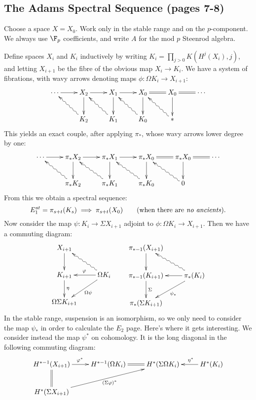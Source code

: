 \documentclass[11pt]{article}
\begin{document}
\begin{ASSp7-8}

\subsection*{The Adams Spectral Sequence (pages 7-8)}
Choose a space $X=X_0$. Work only in the stable range  and on the $p$-component. We always use $\F_p$ coefficients, and write $A$ for the mod $p$ Steenrod algebra.

Define spaces $X_i$ and $K_i$ inductively by writing $K_i=\prod_{j>0}K(H^j(X_i),j)$, and letting $X_{i+1}$ be the fibre of the obvious map $X_i\to K_i$. We have a system of fibrations, with wavy arrows denoting maps $\phi:\Omega K_i\to X_{i+1}$:
\[\xymatrix{
\cdots\ar[r]&
X_2\ar[r]\ar[d]&
X_1\ar[r]\ar[d]&
X_0\ar@{=}[r]\ar[d]&
X_0\ar@{=}[r]\ar[d]&
\cdots\\
&
K_2\ar@{~>}[ul]&
K_1\ar@{~>}[ul]&
K_0\ar@{~>}[ul]&
\ast\ar@{~>}[ul]&
}\]
This yields an exact couple, after applying $\pi_*$, whose wavy arrows lower degree by one:
\[\xymatrix{
\cdots\ar[r]&
\pi_*X_2\ar[r]\ar[d]&
\pi_*X_1\ar[r]\ar[d]&
\pi_*X_0\ar@{=}[r]\ar[d]&
\pi_*X_0\ar@{=}[r]\ar[d]&
\cdots\\
&
\pi_*K_2\ar@{~>}[ul]&
\pi_*K_1\ar@{~>}[ul]&
\pi_*K_0\ar@{~>}[ul]&
0\ar@{~>}[ul]&
}
\]
From this we obtain a spectral sequence:
\[E_1^{st}=\pi_{s+t}(K_s)\implies \pi_{s+t}(X_0)\textup{\qquad (when there are \textit{no ancients}).}\]
Now consider the map $\psi:K_i\to\Sigma X_{i+1}$ adjoint to $\phi:\Omega K_i\to X_{i+1}$. Then we have a commuting diagram:
\[\xymatrix{
X_{i+1}\ar[d]\\
K_{i+1}\ar[d]^\eta&\Omega K_i\ar[l]_\phi\ar[ld]^{\Omega\psi}\ar@{~>}[lu]\\
\Omega\Sigma K_{i+1}
}
\qquad 
\xymatrix{
\pi_{*-1}(X_{i+1})\ar[d]\\
\pi_{*-1}(K_{i+1})\ar[d]^\Sigma&\pi_{*} (K_i)\ar[l]\ar[ld]^{\psi_*}\ar@{~>}[lu]\\
\pi_{*}(\Sigma K_{i+1})
}
\]
In the stable range, suspension is an isomorphism, so we only need to consider the map $\psi_*$ in order to calculate the $E_2$ page. Here's where it gets interesting. We consider instead the map $\psi^*$ on cohomology. It is the long diagonal in the following commuting diagram:
\[\xymatrix{
H^{*-1}(X_{i+1})\ar@{=}[d]\ar[r]^{\phi^*}&H^{*-1}(\Omega K_i)\ar@{=}[r]&H^*(\Sigma\Omega K_i)& H^*(K_i)\ar[l]_{\quad  \eta^*}\\
H^{*}(\Sigma X_{i+1})\ar[rru]_{(\Sigma\phi)^*}&\\
}\]
\end{ASSp7-8}
\end{document}
